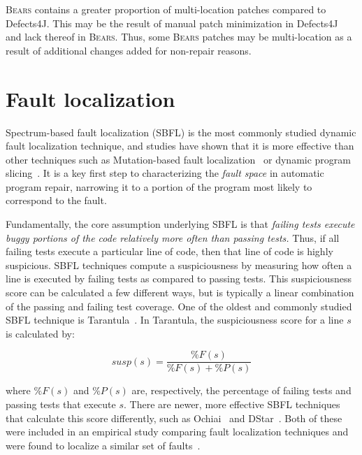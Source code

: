\documentclass[10pt, conference]{IEEEtran}
\newcommand\bears{\textsc{Bears}\xspace}
\begin{document}
\bears contains a greater proportion of 
multi-location patches compared to Defects4J. This may be the 
result of manual patch minimization in Defects4J~\cite{defects4j} 
and lack thereof in \bears.
Thus, some \bears patches may be multi-location as a result of additional 
changes added for non-repair reasons.



\section{Fault localization} \label{secFL}



Spectrum-based fault localization (SBFL) is the most commonly studied dynamic
fault localization technique, and studies have shown that it is more effective
than other techniques such as Mutation-based fault
localization~\cite{mut-analysis} or dynamic program
slicing~\cite{zou2019empirical}. It is a key first step to characterizing the
\emph{fault space} in automatic program repair, narrowing it to a portion of the
program most likely to correspond to the fault.

Fundamentally, the core assumption underlying SBFL is that \emph{failing tests
  execute buggy portions of the code relatively more often than passing tests.}
Thus, if all failing tests execute a particular line of code, then that line of
code is highly suspicious.  SBFL techniques compute a suspiciousness by
measuring how often a line is executed by failing tests as compared to passing
tests. This suspiciousness score can be calculated a few different ways, but is
typically a linear combination of the passing and failing test coverage. One of
the oldest and commonly studied SBFL technique is Tarantula~\cite{tarantula}. In
Tarantula, the suspiciousness score for a line $s$ is calculated by:

$$\mathit{susp(s)} 
=\frac{\mathit{\%F(s)}}{\mathit{\%F(s)} + \mathit{\%P(s)}}$$

where  $\mathit{\%F(s)}$ and $\mathit{\%P(s)}$ are, respectively, the percentage of failing 
tests and passing tests that execute $s$. There are newer, more effective 
SBFL techniques that calculate this score differently, such as Ochiai~\cite{ochiai} and 
DStar~\cite{wong2013dstar}. Both of these were included in an empirical study 
comparing fault localization techniques and were found to localize a similar set of 
faults~\cite{zou2019empirical}.
\end{document}
